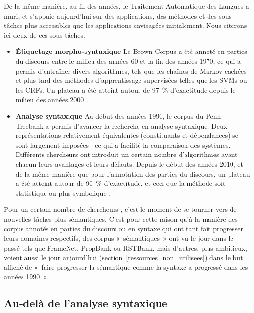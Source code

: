De la même manière, au fil des années, le Traitement Automatique des Langues a
muri, et s'appuie aujourd'hui sur des applications, des méthodes et des
sous-tâches plus accessibles que les applications envisagées initialement. Nous
citerons ici deux de ces sous-tâches.

\begin{itemize}
    \item \textbf{Étiquetage morpho-syntaxique} Le Brown Corpus a été annoté en
parties du discours entre le milieu des années 60 et la fin des années 1970, ce
qui a permis d'entraîner divers algorithmes, tels que les chaînes de Markov
cachées et plus tard des méthodes d'apprentissage supervisées telles que les
SVMs ou les CRFs. Un plateau a été atteint autour de 97~\% d'exactitude depuis
le milieu des années 2000 \citep{manning2011part}.
    \item \textbf{Analyse syntaxique} Au début des années 1990, le corpus du
Penn Treebank \citep{marcus1993building} a permis d'avancer la recherche en
analyse syntaxique. Deux représentations relativement équivalentes
(constituants et dépendances) se sont largement imposées
\citep{rambow2010simple}, ce qui a facilité la comparaison des systèmes.
Différents chercheurs ont introduit un certain nombre d'algorithmes ayant
chacun leurs avantages et leurs défauts. Depuis le début des années 2010, et de
la même manière que pour l'annotation des parties du discours, un plateau a été
atteint autour de 90~\% d'exactitude, et ceci que la méthode soit statistique
ou plus symbolique \citep{clergerie2014jouer}.
\end{itemize}

Pour un certain nombre de chercheurs
\citep{bos2012annotating,banarescu2013abstract}, c'est le moment de se tourner
vers de nouvelles tâches plus sémantiques. C'est pour cette raison qu'à la
manière des corpus annotés en parties du discours ou en syntaxe qui ont tant
fait progresser leurs domaines respectifs, des corpus «~sémantiques~» ont vu le
jour dans le passé tels que FrameNet, PropBank ou RSTBank, mais d'autres, plus
ambitieux, voient aussi le jour aujourd'hui
\citep{bos2012annotating,banarescu2013abstract}
(section~\ref{ressources_non_utilisees}) dans le but affiché de «~faire
progresser la sémantique comme la syntaxe a progressé dans les années 1990~».

\subsection{Au-delà de l'analyse syntaxique}
\label{au_dela}

